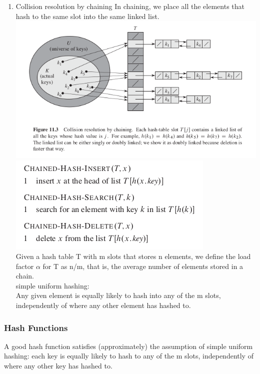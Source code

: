 \documentclass[11pt]{article}
\begin{document}
\begin{enumerate}
\item Collision resolution by chaining
\label{sec-4-2-2-1}
In chaining, we place all the elements that hash to the same slot into the same linked list. \\

\includegraphics[width=.9\linewidth]{pics/c11_hash_table_chaining.png} \\

\includegraphics[width=.9\linewidth]{pics/c11_hash_table_chaining_psudo.png} \\


Given a hash table T with m slots that stores n elements, we define the load factor $\alpha$ for T as n/m, that is, the average number of elements stored in a chain. \\

simple uniform hashing: \\
Any given element is equally likely to hash into any of the m slots, independently of where any other element has hashed to. \\
\end{enumerate}

\subsubsection{Hash Functions}
\label{sec-4-2-3}
A good hash function satisfies (approximately) the assumption of simple uniform hashing: each key is equally likely to hash to any of the m slots, independently of where any other key has hashed to. \\
\end{document}

